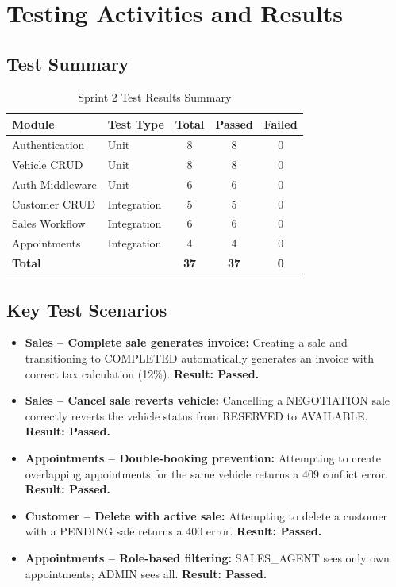 \documentclass[12pt,a4paper]{article}
\newcommand{\thead}[1]{\textbf{\color{white}#1}}
\begin{document}
\newpage
\section{Testing Activities and Results}

\subsection{Test Summary}

\begin{table}[H]
\centering
\renewcommand{\arraystretch}{1.3}
\begin{tabularx}{\textwidth}{|l|Y|c|c|c|}
\hline
{} \thead{Module} & \thead{Test Type} & \thead{Total} & \thead{Passed} & \thead{Failed} \\
\hline
Authentication  & Unit & 8 & 8 & 0 \\
\hline
{}
Vehicle CRUD    & Unit & 8 & 8 & 0 \\
\hline
Auth Middleware  & Unit & 6 & 6 & 0 \\
\hline
{}
Customer CRUD   & Integration & 5 & 5 & 0 \\
\hline
Sales Workflow  & Integration & 6 & 6 & 0 \\
\hline
{}
Appointments    & Integration & 4 & 4 & 0 \\
\hline
\textbf{Total}  & & \textbf{37} & \textbf{37} & \textbf{0} \\
\hline
\end{tabularx}
\caption{Sprint 2 Test Results Summary}
\end{table}

\subsection{Key Test Scenarios}

\begin{itemize}[leftmargin=1.5em, itemsep=4pt]
  \item \textbf{Sales -- Complete sale generates invoice:} Creating a sale and transitioning to COMPLETED automatically generates an invoice with correct tax calculation (12\%). \textbf{Result: Passed.}
  \item \textbf{Sales -- Cancel sale reverts vehicle:} Cancelling a NEGOTIATION sale correctly reverts the vehicle status from RESERVED to AVAILABLE. \textbf{Result: Passed.}
  \item \textbf{Appointments -- Double-booking prevention:} Attempting to create overlapping appointments for the same vehicle returns a 409 conflict error. \textbf{Result: Passed.}
  \item \textbf{Customer -- Delete with active sale:} Attempting to delete a customer with a PENDING sale returns a 400 error. \textbf{Result: Passed.}
  \item \textbf{Appointments -- Role-based filtering:} SALES\_AGENT sees only own appointments; ADMIN sees all. \textbf{Result: Passed.}
\end{itemize}
\end{document}
